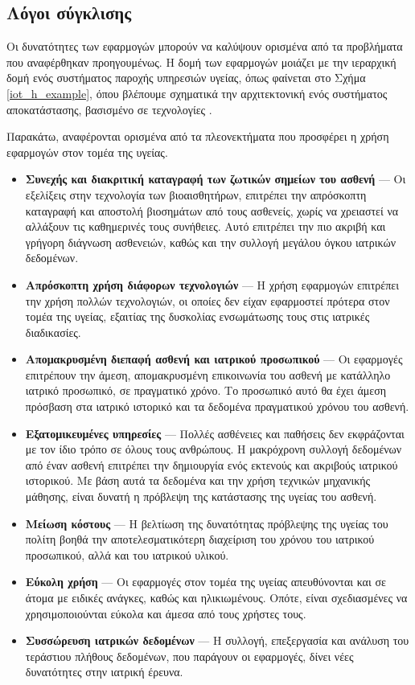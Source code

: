 \subsection{Λόγοι σύγκλισης}
Οι δυνατότητες των εφαρμογών  μπορούν να καλύψουν ορισμένα από τα προβλήματα που αναφέρθηκαν προηγουμένως. Η δομή των εφαρμογών  μοιάζει με την ιεραρχική δομή ενός συστήματος παροχής υπηρεσιών υγείας, όπως φαίνεται στο Σχήμα \ref{iot_h_example}, όπου βλέπουμε σχηματικά την αρχιτεκτονική ενός συστήματος αποκατάστασης, βασισμένο σε τεχνολογίες .

Παρακάτω, αναφέρονται ορισμένα από τα πλεονεκτήματα που προσφέρει η χρήση  εφαρμογών στον τομέα της υγείας.
\begin{itemize}
    \item \textbf{Συνεχής και διακριτική καταγραφή των ζωτικών σημείων του ασθενή} ---
    Οι εξελίξεις στην τεχνολογία των βιοαισθητήρων, επιτρέπει την απρόσκοπτη καταγραφή και αποστολή βιοσημάτων από τους ασθενείς, χωρίς να χρειαστεί να αλλάξουν τις καθημερινές τους συνήθειες. Αυτό επιτρέπει την πιο ακριβή και γρήγορη διάγνωση ασθενειών, καθώς και την συλλογή μεγάλου όγκου ιατρικών δεδομένων.
    \item \textbf{Απρόσκοπτη χρήση διάφορων τεχνολογιών} ---
    Η χρήση εφαρμογών  επιτρέπει την χρήση πολλών τεχνολογιών, οι οποίες δεν είχαν εφαρμοστεί πρότερα στον τομέα της υγείας, εξαιτίας της δυσκολίας ενσωμάτωσης τους στις ιατρικές διαδικασίες.
    \item \textbf{Απομακρυσμένη διεπαφή ασθενή και ιατρικού προσωπικού} ---
    Οι εφαρμογές  επιτρέπουν την άμεση, απομακρυσμένη επικοινωνία του ασθενή με κατάλληλο ιατρικό προσωπικό, σε πραγματικό χρόνο. Το προσωπικό αυτό θα έχει άμεση πρόσβαση στα ιατρικό ιστορικό και τα δεδομένα πραγματικού χρόνου του ασθενή.
    \item \textbf{Εξατομικευμένες υπηρεσίες} ---
    Πολλές ασθένειες και παθήσεις δεν εκφράζονται με τον ίδιο τρόπο σε όλους τους ανθρώπους. Η μακρόχρονη συλλογή δεδομένων από έναν ασθενή επιτρέπει την δημιουργία ενός εκτενούς και ακριβούς ιατρικού ιστορικού. Με βάση αυτά τα δεδομένα και την χρήση τεχνικών μηχανικής μάθησης, είναι δυνατή η πρόβλεψη της κατάστασης της υγείας του ασθενή. 
    \item \textbf{Μείωση κόστους} ---
    Η βελτίωση της δυνατότητας πρόβλεψης της υγείας του πολίτη βοηθά την αποτελεσματικότερη διαχείριση του χρόνου του ιατρικού προσωπικού, αλλά και του ιατρικού υλικού.
    \item \textbf{Εύκολη χρήση} ---
    Οι εφαρμογές  στον τομέα της υγείας απευθύνονται και σε άτομα με ειδικές ανάγκες, καθώς και ηλικιωμένους. Οπότε, είναι σχεδιασμένες να χρησιμοποιούνται εύκολα και άμεσα από τους χρήστες τους.
    \item \textbf{Συσσώρευση ιατρικών δεδομένων} ---
    Η συλλογή, επεξεργασία και ανάλυση του τεράστιου πλήθους δεδομένων, που παράγουν οι  εφαρμογές, δίνει νέες δυνατότητες στην ιατρική έρευνα.
\end{itemize}
